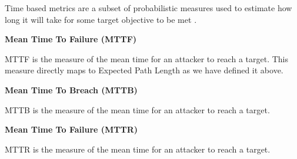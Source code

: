 

Time based metrics are a subset of probabilistic measures used to estimate how long it will take for some target objective to be met \cite{Dacier_Deswarte_Kaaniche}\cite{Ortalo_1999}\cite{McQueen_Boyer_Flynn_Beitel_2006}. 

\textbf{Mean Time To Failure (MTTF)} 

MTTF is the measure of the mean time for an attacker to reach a target. This measure directly maps to Expected Path Length as we have defined it above. 

\textbf{Mean Time To Breach (MTTB)} 

MTTB is the measure of the mean time for an attacker to reach a target. 

\textbf{Mean Time To Failure (MTTR)} 

MTTR is the measure of the mean time for an attacker to reach a target. 